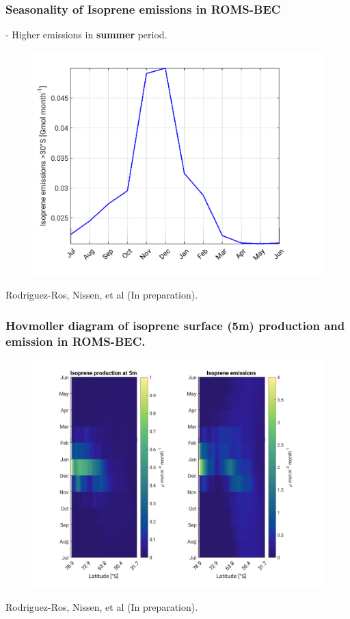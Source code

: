 \documentclass{beamer}
\begin{document}
\begin{frame}
\frametitle{Seasonality of Isoprene emissions in ROMS-BEC}
- Higher emissions in \textbf{summer} period.
\begin{figure}
\includegraphics[width=0.70\linewidth]{Isoprene_emissions_monthly_timeSeries_031.png}
\end{figure}
\tiny  Rodriguez-Ros, Nissen, et al (In preparation).
\end{frame}

\begin{frame}
\frametitle{Hovmoller diagram of isoprene surface (5m) production and emission in ROMS-BEC.}
\begin{figure}
\includegraphics[width=0.7\linewidth]{Hovmoller_031_isoprene_prod_at_5m_srf_flux_circumpolar.png}
\end{figure}
\tiny  Rodriguez-Ros, Nissen, et al (In preparation).

\end{frame}

\end{document}
